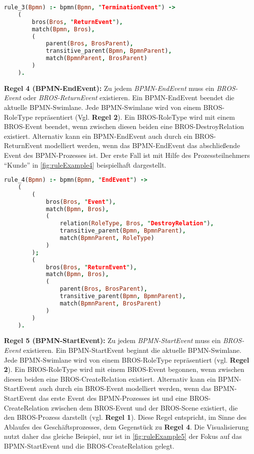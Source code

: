 \begin{lstlisting}[language=Prolog, caption=Formalisierung der Regel 3, label=lst:rule_3]
rule_3(Bpmn) :- bpmn(Bpmn, "TerminationEvent") ->
    (
        bros(Bros, "ReturnEvent"), 
        match(Bpmn, Bros),
        (
            parent(Bros, BrosParent),
            transitive_parent(Bpmn, BpmnParent),
            match(BpmnParent, BrosParent)
        )
    ).
\end{lstlisting}

\textbf{Regel 4 (BPMN-EndEvent):}
Zu jedem \emph{BPMN-EndEvent} muss ein \emph{BROS-Event} oder \emph{BROS-ReturnEvent} existieren.
Ein BPMN-EndEvent beendet die aktuelle BPMN-Swimlane.
Jede BPMN-Swimlane wird von einem BROS-RoleType repräsentiert (Vgl. \textbf{Regel 2}).
Ein BROS-RoleType wird mit einem BROS-Event beendet, wenn zwischen diesen beiden eine BROS-DestroyRelation existiert.
Alternativ kann ein BPMN-EndEvent auch durch ein BROS-ReturnEvent modelliert werden, wenn das BPMN-EndEvent das abschließende Event des BPMN-Prozesses ist.
Der erste Fall ist mit Hilfe des Prozessteilnehmers ``Kunde'' in \cref{fig:ruleExample4} beispielhaft dargestellt.

\pagebreak

\begin{lstlisting}[language=Prolog, caption=Formalisierung der Regel 4, label=lst:rule_4]
rule_4(Bpmn) :- bpmn(Bpmn, "EndEvent") ->
    (
        (
            bros(Bros, "Event"),
            match(Bpmn, Bros),
            (
                relation(RoleType, Bros, "DestroyRelation"),
                transitive_parent(Bpmn, BpmnParent),
                match(BpmnParent, RoleType)
            )
        );
        (
            bros(Bros, "ReturnEvent"), 
            match(Bpmn, Bros),
            (
                parent(Bros, BrosParent),
                transitive_parent(Bpmn, BpmnParent),
                match(BpmnParent, BrosParent)
            )
        )
    ).
\end{lstlisting}

\textbf{Regel 5 (BPMN-StartEvent):}
Zu jedem \emph{BPMN-StartEvent} muss ein \emph{BROS-Event} existieren.
Ein BPMN-StartEvent beginnt die aktuelle BPMN-Swimlane.
Jede BPMN-Swimlane wird von einem BROS-RoleType repräsentiert (vgl. \textbf{Regel 2}).
Ein BROS-RoleType wird mit einem BROS-Event begonnen, wenn  zwischen diesen beiden eine BROS-CreateRelation existiert.
Alternativ kann ein BPMN-StartEvent auch durch ein BROS-Event modelliert werden, wenn das BPMN-StartEvent das erste Event des BPMN-Prozesses ist und eine BROS-CreateRelation zwischen dem BROS-Event und der BROS-Scene existiert, die den BROS-Prozess darstellt (vgl. \textbf{Regel 1}).
Diese Regel entspricht, im Sinne des Ablaufes des Geschäftsprozesses, dem Gegenstück zu \textbf{Regel 4}.
Die Visualisierung nutzt daher das gleiche Beispiel, nur ist in \cref{fig:ruleExample5} der Fokus auf das BPMN-StartEvent und die BROS-CreateRelation gelegt.

